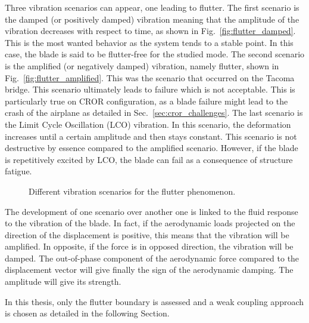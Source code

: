 Three vibration scenarios can appear, one leading to flutter.
The first scenario is the damped (or positively damped) 
vibration meaning
that the amplitude of the vibration decreases with respect to time, 
as shown in Fig.~\ref{fig:flutter_damped}.
This is the most wanted behavior as the system tends to
a stable point. In this case, the blade is said to
be flutter-free for the studied mode.
The second scenario is the amplified (or negatively damped)
vibration, namely flutter, shown in Fig.~\ref{fig:flutter_amplified}. 
This was the scenario that occurred on the Tacoma bridge. 
This scenario ultimately
leads to failure which is not acceptable. This is particularly true
on CROR configuration, as a blade failure might lead to 
the crash of the airplane as detailed in Sec.~\ref{sec:cror_challenges}.
The last scenario is the Limit Cycle Oscillation (LCO) vibration.
In this scenario, the deformation increases until a certain 
amplitude and then stays constant. This scenario is not
destructive by essence compared to the amplified scenario. However,
if the blade is repetitively excited by LCO, the blade
can fail as a consequence of structure fatigue.
\begin{figure}[htp]
  \centering
  \caption{Different vibration scenarios for the flutter phenomenon.}
\end{figure}

The development of one scenario over another one is linked to
the fluid response to the vibration of the blade. In fact,
if the aerodynamic loads projected on the direction of the displacement
is positive, this means that the vibration will be amplified. 
In opposite, if the force is in opposed direction, the vibration will be damped.
The out-of-phase component of the aerodynamic force compared to
the displacement vector will give finally the sign of the aerodynamic damping.
The amplitude will give its strength. 

In this thesis, only the flutter boundary is assessed
and a weak coupling approach is chosen
as detailed in the following Section.
